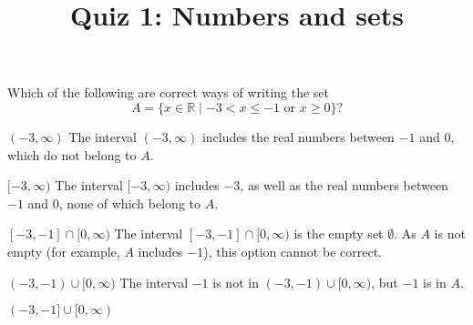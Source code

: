 \documentclass[pst2pdf]{webquiz}
\title{Quiz 1: Numbers and sets}
\newcommand{\R}{\mathbb R}
\begin{document}
%
%
%


        \begin{question}
        Which of the following are correct ways of writing the set
        \[ A=\{x \in \mathbb{R} \mid -3 < x \leq -1 \text{ or } x\geq 0\} ?\]
        \begin{choice}
        \incorrect $(-3,\infty)$
        The interval \response $(-3,\infty)$ includes the real numbers between $-1$ and $0$,
        which do not belong to $A$.

        \incorrect $[-3,\infty)$
        \response The interval $[-3,\infty)$ includes $-3$, as well as
        the real numbers between $-1$ and $0$, none of which
         belong to $A$.

        \incorrect $[-3,-1]\cap[0,\infty)$
        \response The interval $[-3,-1]\cap[0,\infty)$ is the empty set $\emptyset$. As $A$ is not empty (for example, $A$ includes $-1$), this option cannot be correct.

        \incorrect $(-3,-1)\cup[0,\infty)$
        \response The interval $-1$ is not in $(-3,-1)\cup[0,\infty)$, but $-1$ is in $A$.

        \correct $(-3,-1]\cup[0,\infty)$

        \end{choice}
\end{question}
\end{document}
